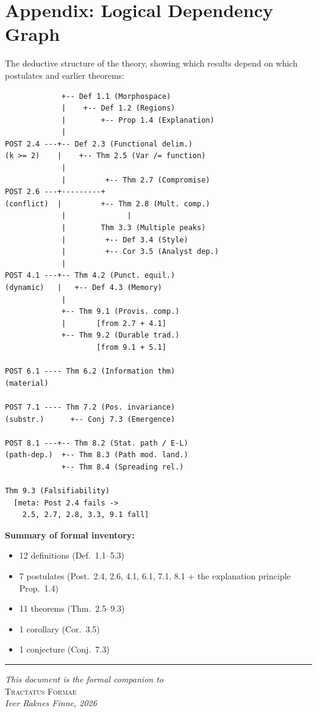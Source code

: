 \documentclass[10pt]{article}
\renewcommand{\small}{\fontsize{9pt}{11pt}\selectfont}
\theoremstyle{definition}
\theoremstyle{plain}
\theoremstyle{remark}
\begin{document}
\newpage
\section*{Appendix: Logical Dependency Graph}

The deductive structure of the theory, showing which results
depend on which postulates and earlier theorems:

\medskip
\begin{scriptsize}
\begin{verbatim}
             +-- Def 1.1 (Morphospace)
             |    +-- Def 1.2 (Regions)
             |        +-- Prop 1.4 (Explanation)
             |
POST 2.4 ---+-- Def 2.3 (Functional delim.)
(k >= 2)    |    +-- Thm 2.5 (Var /= function)
             |
             |         +-- Thm 2.7 (Compromise)
POST 2.6 ---+---------+
(conflict)  |         +-- Thm 2.8 (Mult. comp.)
             |              |
             |        Thm 3.3 (Multiple peaks)
             |         +-- Def 3.4 (Style)
             |         +-- Cor 3.5 (Analyst dep.)
             |
POST 4.1 ---+-- Thm 4.2 (Punct. equil.)
(dynamic)   |   +-- Def 4.3 (Memory)
             |
             +-- Thm 9.1 (Provis. comp.)
             |       [from 2.7 + 4.1]
             +-- Thm 9.2 (Durable trad.)
                     [from 9.1 + 5.1]

POST 6.1 ---- Thm 6.2 (Information thm)
(material)

POST 7.1 ---- Thm 7.2 (Pos. invariance)
(substr.)      +-- Conj 7.3 (Emergence)

POST 8.1 ---+-- Thm 8.2 (Stat. path / E-L)
(path-dep.)  +-- Thm 8.3 (Path mod. land.)
             +-- Thm 8.4 (Spreading rel.)

Thm 9.3 (Falsifiability)
  [meta: Post 2.4 fails ->
    2.5, 2.7, 2.8, 3.3, 9.1 fall]
\end{verbatim}
\end{scriptsize}

\medskip\noindent
\textbf{Summary of formal inventory:}
\begin{itemize}[nosep]
  \item 12 definitions (Def.~1.1--5.3)
  \item 7 postulates (Post.~2.4, 2.6, 4.1, 6.1, 7.1, 8.1
    + the explanation principle Prop.~1.4)
  \item 11 theorems (Thm.~2.5--9.3)
  \item 1 corollary (Cor.~3.5)
  \item 1 conjecture (Conj.~7.3)
\end{itemize}

\vfill
\begin{center}
\rule{4cm}{0.4pt}

\medskip
{\small\itshape This document is the formal companion to}\\
{\small\scshape Tractatus Formae}\\
{\small\itshape Iver Raknes Finne, 2026}
\end{center}
\end{document}
